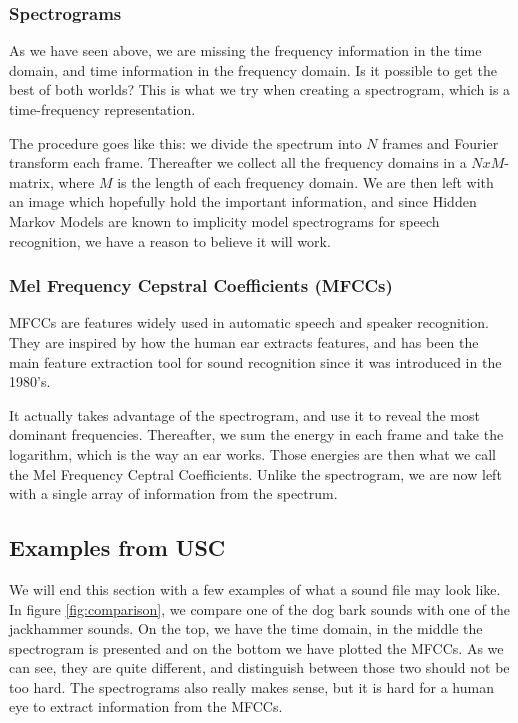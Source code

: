 \subsubsection*{Spectrograms}
As we have seen above, we are missing the frequency information in the time domain, and time information in the frequency domain. Is it possible to get the best of both worlds? This is what we try when creating a spectrogram, which is a time-frequency representation. 

The procedure goes like this: we divide the spectrum into $N$ frames and Fourier transform each frame. Thereafter we collect all the frequency domains in a $NxM$-matrix, where $M$ is the length of each frequency domain. We are then left with an image which hopefully hold the important information, and since Hidden Markov Models are known to implicity model spectrograms for speech recognition, we have a reason to believe it will work. \cite{spectrograms}

\subsubsection*{Mel Frequency Cepstral Coefficients (MFCCs)}
MFCCs are features widely used in automatic speech and speaker recognition. \cite{mfcc} They are inspired by how the human ear extracts features, and has been the main feature extraction tool for sound recognition since it was introduced in the 1980's. 

It actually takes advantage of the spectrogram, and use it to reveal the most dominant frequencies. Thereafter, we sum the energy in each frame and take the logarithm, which is the way an ear works. Those energies are then what we call the Mel Frequency Ceptral Coefficients. Unlike the spectrogram, we are now left with a single array of information from the spectrum. 

\subsection{Examples from USC}
We will end this section with a few examples of what a sound file may look like. In figure \eqref{fig:comparison}, we compare one of the dog bark sounds with one of the jackhammer sounds. On the top, we have the time domain, in the middle the spectrogram is presented and on the bottom we have plotted the MFCCs. As we can see, they are quite different, and distinguish between those two should not be too hard. The spectrograms also really makes sense, but it is hard for a human eye to extract information from the MFCCs. 

